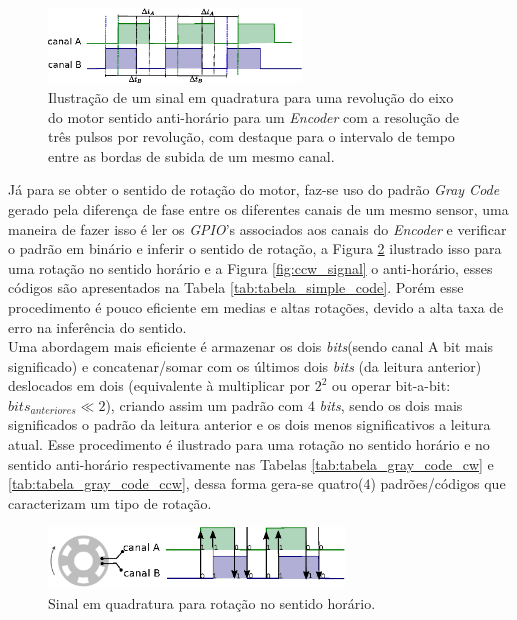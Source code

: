 \begin{figure}[H]
    \centering
    \includegraphics[width=0.6\textwidth]{imagens/ilustracoes/sinal_em_quadratura_sentido_CCW_detalhada.eps}
    \caption{Ilustração de um sinal em quadratura para uma revolução do eixo do motor sentido anti-horário para um \emph{Encoder} com a resolução de três pulsos por revolução, com destaque para o intervalo de tempo entre as bordas de subida de um mesmo canal.}
    \label{fig:sinal_em_quadratura_delta_t}
\end{figure}



Já para se obter o sentido de rotação do motor, faz-se uso do padrão \emph{Gray Code} gerado pela diferença de fase entre os diferentes canais de um mesmo sensor, uma maneira de fazer isso é ler os \emph{GPIO}'s associados aos canais do \emph{Encoder} e verificar o padrão em binário e inferir o sentido de rotação, a Figura \ref{fig:cw_signal} ilustrado isso para uma rotação no sentido horário e a Figura \ref{fig:ccw_signal} o anti-horário, esses códigos são apresentados na Tabela \ref{tab:tabela_simple_code}. Porém esse procedimento é pouco eficiente em medias e altas rotações, devido a alta taxa de erro na inferência do sentido.\\

Uma abordagem mais eficiente é armazenar os dois \emph{bits}(sendo canal A bit mais significado) e concatenar/somar com os últimos dois \emph{bits} (da leitura anterior) deslocados em dois (equivalente à multiplicar por $2^2$ ou operar bit-a-bit: $bits_{anteriores} \ll 2$), criando assim um padrão com $4$ \emph{bits}, sendo os dois mais significados o padrão da leitura anterior e os dois menos significativos a leitura atual. Esse procedimento é ilustrado para uma rotação no sentido horário e no sentido anti-horário respectivamente nas Tabelas \ref{tab:tabela_gray_code_cw} e \ref{tab:tabela_gray_code_ccw}, dessa forma gera-se quatro($4$) padrões/códigos que caracterizam um tipo de rotação.

\begin{figure}[H]
    \centering
    \includegraphics[width=0.7\textwidth]{imagens/ilustracoes/sinal_enquadratura_sentido_CW.eps}
    \caption{Sinal em quadratura para rotação no sentido horário.}
    \label{fig:cw_signal}
\end{figure}

